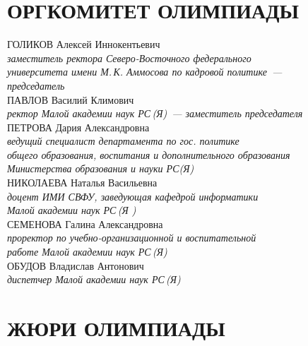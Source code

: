 \newpage
\noindent
\section*{ОРГКОМИТЕТ ОЛИМПИАДЫ}
\thispagestyle{plain}

ГОЛИКОВ Алексей Иннокентьевич \\ 
\textit{заместитель ректора Северо-Восточного федерального \\
университета имени М.\,К. Аммосова по кадровой политике~--- \\
председатель}
\\[3mm]
ПАВЛОВ Василий Климович \\
\textit{ректор Малой академии наук РС\,(Я)~--- заместитель председателя}
\\[3mm]
ПЕТРОВА Дария Александровна \\
\textit{ведущий специалист департамента по гос. политике \\
общего образования, воспитания и дополнительного образования \\
Министерства образования и науки РС(Я)}
\\[3mm]
НИКОЛАЕВА Наталья Васильевна \\
\textit{доцент ИМИ СВФУ, заведующая кафедрой информатики \\
Малой академии наук РС\,(Я  )}
\\[3mm]
СЕМЕНОВА Галина Александровна \\
\textit{проректор по учебно-организационной и воспитательной \\ 
работе Малой академии наук РС\,(Я)} 
\\[3mm]
ОБУДОВ Владислав Антонович \\
\textit{диспетчер  Малой академии наук РС\,(Я)}
\\[3mm]

\newpage
\section*{ЖЮРИ ОЛИМПИАДЫ}
\thispagestyle{plain}

